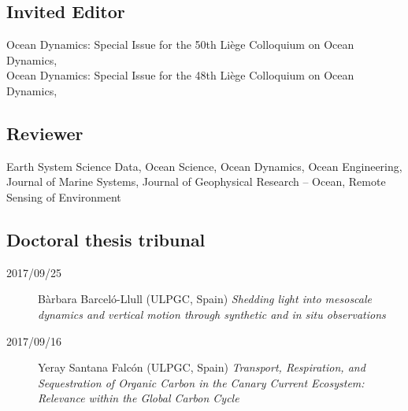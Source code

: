 \documentclass[10pt,a4paper,svgnames]{article}
\begin{document}




 


\subsection{Invited Editor}

Ocean Dynamics: Special Issue for the 50th Li\`{e}ge Colloquium on Ocean Dynamics, \\
Ocean Dynamics: Special Issue for the 48th Li\`{e}ge Colloquium on Ocean Dynamics, 

\subsection{Reviewer}

Earth System Science Data, Ocean Science, Ocean Dynamics, Ocean Engineering, Journal of Marine Systems, Journal of Geophysical Research -- Ocean, Remote Sensing of Environment

\subsection{Doctoral thesis tribunal}

\begin{description}
\item[2017/09/25] Bàrbara Barceló-Llull (ULPGC, Spain) {\newline \textit{Shedding light into mesoscale dynamics and vertical motion through synthetic and in situ observations}}

\item[2017/09/16] Yeray Santana Falc\'{o}n (ULPGC, Spain) {\newline \textit{Transport, Respiration, and Sequestration of Organic Carbon in the Canary Current Ecosystem: Relevance within the Global Carbon Cycle}}
\end{description}
\end{document}
